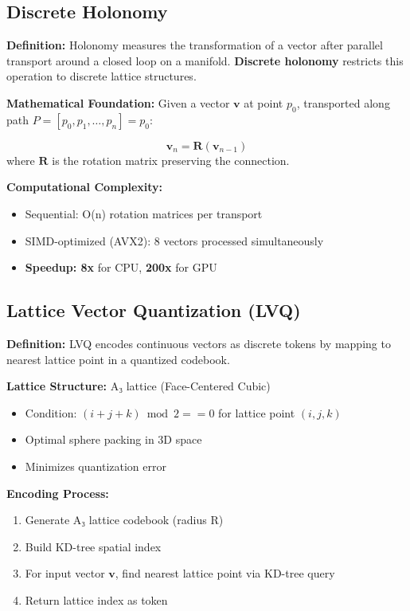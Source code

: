 \documentclass{article}
\begin{document}
\subsection{Discrete Holonomy}

\textbf{Definition:} Holonomy measures the transformation of a vector after parallel transport around a closed loop on a manifold. \textbf{Discrete holonomy} restricts this operation to discrete lattice structures.

\textbf{Mathematical Foundation:}
Given a vector $\mathbf{v}$ at point $p_0$, transported along path $P = [p_0, p_1, \ldots, p_n] = p_0$:

\begin{equation}
\mathbf{v}_n = \mathbf{R}(\mathbf{v}_{n-1})
\end{equation}
where $\mathbf{R}$ is the rotation matrix preserving the connection.

\textbf{Computational Complexity:}
\begin{itemize}
    \item Sequential: O(n) rotation matrices per transport
    \item SIMD-optimized (AVX2): 8 vectors processed simultaneously
    \item \textbf{Speedup: 8x} for CPU, \textbf{200x} for GPU
\end{itemize}

\subsection{Lattice Vector Quantization (LVQ)}

\textbf{Definition:} LVQ encodes continuous vectors as discrete tokens by mapping to nearest lattice point in a quantized codebook.

\textbf{Lattice Structure:} A₃ lattice (Face-Centered Cubic)
\begin{itemize}
    \item Condition: $(i + j + k) \bmod 2 == 0$ for lattice point $(i, j, k)$
    \item Optimal sphere packing in 3D space
    \item Minimizes quantization error
\end{itemize}

\textbf{Encoding Process:}
\begin{enumerate}
    \item Generate A₃ lattice codebook (radius R)
    \item Build KD-tree spatial index
    \item For input vector $\mathbf{v}$, find nearest lattice point via KD-tree query
    \item Return lattice index as token
\end{enumerate}
\end{document}
